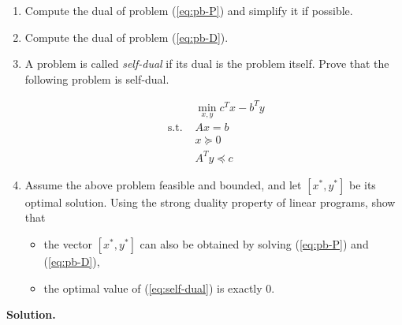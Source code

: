\documentclass[a4paper, 11pt]{report}
\begin{document}
\begin{enumerate}
    \item Compute the dual of problem (\ref{eq:pb-P}) and simplify it if possible.
    
    \item Compute the dual of problem (\ref{eq:pb-D}).
    
    \item A problem is called \emph{self-dual} if its dual is the problem itself. Prove that the following problem is self-dual.
    
    \begin{equation}
    \tag{Self-Dual}
        \begin{aligned}
        & \min_{x, y}
        c^{T} x - b^{T} y \\
        \text{ s.t. }
        & Ax = b \\
        & x \succeq 0 \\
        & A^{T} y \preceq c
        \end{aligned}
    \label{eq:self-dual}
    \end{equation}

    \item Assume the above problem feasible and bounded, and let $[x^{*}, y^{*}]$ be its optimal solution. Using the strong duality property of linear programs, show that
    
    \begin{itemize}
        \item the vector $[x^{*}, y^{*}]$ can also be obtained by solving (\ref{eq:pb-P}) and (\ref{eq:pb-D}),
        
        \item the optimal value of (\ref{eq:self-dual}) is exactly $0$.
    \end{itemize}
\end{enumerate}

\noindent \textbf{Solution.}
\end{document}

